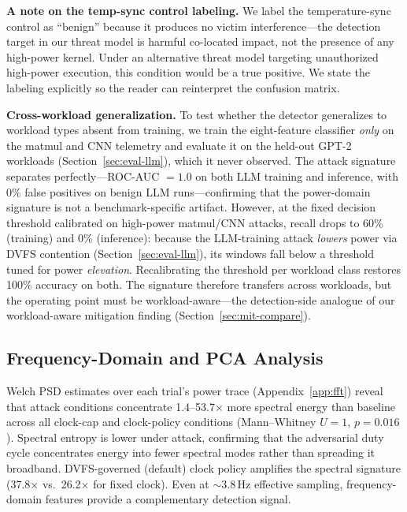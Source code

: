 \documentclass[letterpaper,twocolumn,10pt]{article}
\begin{document}
\textbf{A note on the temp-sync control labeling.}
We label the temperature-sync control as ``benign'' because it
produces no victim interference---the detection target in our
threat model is harmful co-located impact, not the presence of any
high-power kernel.  Under an alternative threat model targeting
unauthorized high-power execution, this condition would be a true
positive.  We state the labeling explicitly so the reader can
reinterpret the confusion matrix.

\textbf{Cross-workload generalization.}
To test whether the detector generalizes to workload types absent
from training, we train the eight-feature classifier \emph{only} on
the matmul and CNN telemetry and evaluate it on the held-out GPT-2
workloads (Section~\ref{sec:eval-llm}), which it never observed.
The attack signature separates perfectly---ROC-AUC $=1.0$ on both
LLM training and inference, with 0\% false positives on benign LLM
runs---confirming that the power-domain signature is not a
benchmark-specific artifact.  However, at the fixed decision
threshold calibrated on high-power matmul/CNN attacks, recall drops
to 60\% (training) and 0\% (inference): because the LLM-training
attack \emph{lowers} power via DVFS contention
(Section~\ref{sec:eval-llm}), its windows fall below a
threshold tuned for power \emph{elevation}.  Recalibrating the
threshold per workload class restores 100\% accuracy on both.  The
signature therefore transfers across workloads, but the operating
point must be workload-aware---the detection-side analogue of our
workload-aware mitigation finding (Section~\ref{sec:mit-compare}).

\subsection{Frequency-Domain and PCA Analysis}
\label{sec:fft-pca-summary}

Welch PSD estimates over each trial's power trace
(Appendix~\ref{app:fft}) reveal that attack conditions
concentrate 1.4--53.7$\times$ more spectral energy than baseline
across all clock-cap and clock-policy conditions
(Mann--Whitney $U{=}1$, $p{=}0.016$).
Spectral entropy is lower under attack, confirming that the
adversarial duty cycle concentrates energy into fewer spectral
modes rather than spreading it broadband.  DVFS-governed (default)
clock policy amplifies the spectral signature (37.8$\times$ vs.\
26.2$\times$ for fixed clock).  Even at $\sim$3.8\,Hz effective
sampling, frequency-domain features provide a complementary
detection signal.
\end{document}
